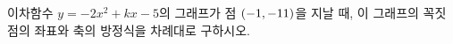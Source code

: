 이차함수 $y=-2x^2+kx-5$의 그래프가 점 $(-1{,}\mkern3mu\mathopen{}-11)$을 지날 때, 이 그래프의 꼭짓점의 좌표와 축의 방정식을 차례대로 구하시오. 
